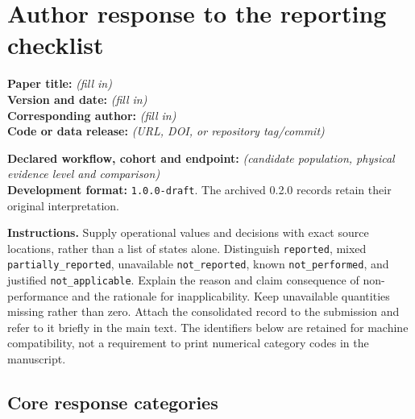 \documentclass[10pt,a4paper]{article}
\begin{document}
\section*{Author response to the reporting checklist}

\noindent\textbf{Paper title:} \emph{(fill in)}\\
\textbf{Version and date:} \emph{(fill in)}\\
\textbf{Corresponding author:} \emph{(fill in)}\\
\textbf{Code or data release:} \emph{(URL, DOI, or repository tag/commit)}

\medskip
\noindent\textbf{Declared workflow, cohort and endpoint:} \emph{(candidate population, physical evidence level and comparison)}\\
\textbf{Development format:} \texttt{1.0.0-draft}. The archived 0.2.0 records retain their original interpretation.

\medskip
\noindent\textbf{Instructions.} Supply operational values and decisions with exact source locations, rather than a list of states alone. Distinguish \texttt{reported}, mixed \texttt{partially\_reported}, unavailable \texttt{not\_reported}, known \texttt{not\_performed}, and justified \texttt{not\_applicable}. Explain the reason and claim consequence of non-performance and the rationale for inapplicability. Keep unavailable quantities missing rather than zero. Attach the consolidated record to the submission and refer to it briefly in the main text. The identifiers below are retained for machine compatibility, not a requirement to print numerical category codes in the manuscript.

\setlength{\LTpre}{4pt}
\setlength{\LTpost}{8pt}

\subsection*{Core response categories}
\end{document}
